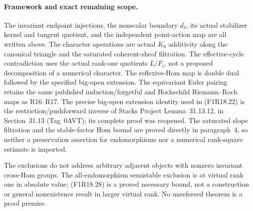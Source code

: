 \paragraph{Framework and exact remaining scope.}
The invariant endpoint injections, the nonscalar
boundary $d_\delta$, its actual stabilizer kernel and
tangent quotient, and the independent point-action
map are all written above. The character operations
are actual $K_0$ additivity along the canonical
triangle and the saturated coherent-sheaf filtration.
The effective-cycle contradiction uses the actual
rank-one quotients $L/F_i$, not a proposed decomposition
of a numerical character. The reflexive-Hom map is
double dual followed by the specified big-open
extension. The equivariant Euler pairing retains the
same published induction/forgetful and Hochschild
Riemann--Roch maps as R16--R17.
The precise big-open extension identity used in
(F1R18.22) is the restriction/pushforward inverse of
Stacks Project Lemma~31.13.12, in Section~31.13
(Tag~0AVT); its complete proof was reopened. The
saturated slope filtration and the stable-factor Hom
bound are proved directly in paragraph~4, so neither
a preservation assertion for endomorphisms nor a
numerical rank-square estimate is imported.

The exclusions do not address arbitrary adjacent
objects with nonzero invariant cross-Hom groups. The
all-endomorphism semistable exclusion is at virtual
rank one in absolute value; (F1R18.28) is a proved
necessary bound, not a construction or general
nonexistence result in larger virtual rank. No
unrefereed theorem is a proof premise.
